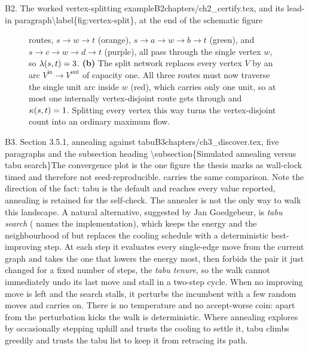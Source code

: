 \begin{offcut}{B2. The worked vertex-splitting example}{B2}{chapters/ch2\_certify.tex,  and its lead-in paragraph}{\textbackslash{}label\{fig:vertex-split\}, at the end of the schematic figure}
\begin{figure}[ht]
{routes, $s \to w \to t$ (orange), $s \to a \to w \to b \to t$ (green), and
$s \to c \to w \to d \to t$ (purple), all pass through the single vertex $w$,
so $\lambda(s,t)=3$. \textbf{(b)} The split network replaces every vertex $V$ by
an arc $V^{\mathrm{in}} \to V^{\mathrm{out}}$ of capacity one. All three routes
must now traverse the single unit arc inside $w$ (red), which carries only one
unit, so at most one internally vertex-disjoint route gets through and
$\kappa(s,t)=1$. Splitting every vertex this way turns the vertex-disjoint count
into an ordinary maximum flow.}
\label{fig:vertex-split-example}
\end{figure}
\end{offcut}

\begin{offcutrewrite}{B3. Section 3.5.1, annealing against tabu}{B3}{chapters/ch3\_discover.tex, five paragraphs and }{the subsection heading \textbackslash{}subsection\{Simulated annealing versus tabu search\}}{The convergence plot is the one figure the thesis marks as wall-clock timed and therefore not seed-reproducible.  carries the same comparison. Note the direction of the fact: tabu is the default and reaches every value reported, annealing is retained for the self-check.}
The annealer is not the only way to walk this landscape. A natural alternative, suggested by Jan Goedgebeur, is \emph{tabu search} ( names the implementation), which keeps the energy and the neighbourhood of  but replaces the cooling schedule with a deterministic best-improving step. At each step it evaluates every single-edge move from the current graph and takes the one that lowers the energy most, then forbids the pair it just changed for a fixed number of steps, the \emph{tabu tenure}, so the walk cannot immediately undo its last move and stall in a two-step cycle. When no improving move is left and the search stalls, it perturbs the incumbent with a few random moves and carries on. There is no temperature and no accept-worse coin: apart from the perturbation kicks the walk is deterministic. Where annealing explores by occasionally stepping uphill and trusts the cooling to settle it, tabu climbs greedily and trusts the tabu list to keep it from retracing its path.


\end{offcutrewrite}
